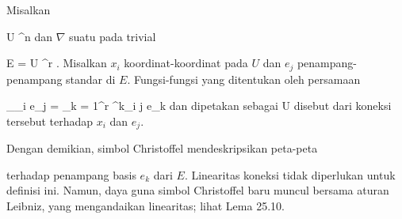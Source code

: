 
{}
{

Misalkan

\mavergleichskette
{\vergleichskette
{ U
}
{ \subseteq }{ \R^n
}
{  }{
}
{    }{
}
{   }{
}
}
{}{}{}
dan $\nabla$ suatu
pada
trivial

\mavergleichskette
{\vergleichskette
{ E
}
{ = }{ U \times \R^r
}
{  }{
}
{    }{
}
{   }{
}
}
{}{}{.}
Misalkan $x_i$ koordinat-koordinat pada $U$ dan $e_j$ penampang-penampang standar di $E$. Fungsi-fungsi yang ditentukan oleh persamaan

\mavergleichskettedisp
{\vergleichskette
{ \nabla_{\partial_i } e_j
}
{ =} { \sum_{k = 1}^r \Gamma^k_{i j}  e_k
}
{ } {
}
{ } {
}
{ } {}
}
{}{}{}
dan dipetakan sebagai
 { U } {\R
} {}
disebut
dari koneksi tersebut terhadap $x_i$ dan $e_j$.

}

Dengan demikian, simbol Christoffel mendeskripsikan peta-peta

 {  }

terhadap penampang basis $e_k$ dari $E$. Linearitas koneksi tidak diperlukan untuk definisi ini. Namun, daya guna simbol Christoffel baru muncul bersama
aturan Leibniz,
yang mengandaikan linearitas; lihat
Lema 25.10.

